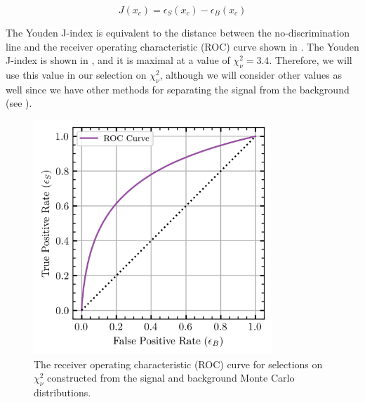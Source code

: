 \begin{equation}
  J(x_c) = \epsilon_S(x_c) - \epsilon_B(x_c)
  \label{eq:youden-j}
\end{equation}

The Youden J-index is equivalent to the distance between the no-discrimination line and the receiver operating characteristic (ROC) curve shown in . The Youden J-index is shown in , and it is maximal at a value of $\chi^2_\nu = 3.4$. Therefore, we will use this value in our selection on $\chi^2_\nu$, although we will consider other values as well since we have other methods for separating the signal from the background (see ).

\begin{figure}
  \begin{center}
    \includegraphics[width=0.8\textwidth]{figures/data_combined_chisqdof_roc.png}
  \end{center}
  \caption{The receiver operating characteristic (ROC) curve for selections on $\chi^2_\nu$ constructed from the signal and background Monte Carlo distributions.}\label{fig:data-combined-chisqdof-roc}
\end{figure}

